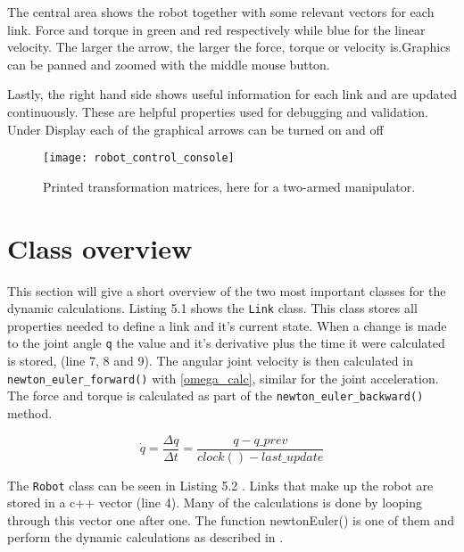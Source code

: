 The central area shows the robot together with some relevant vectors for each link. Force and torque in green and red respectively while blue for the linear velocity. The larger the arrow, the larger the force, torque or velocity is.Graphics can be panned and zoomed with the middle mouse button.

Lastly, the right hand side shows useful information for each link and are updated continuously. These are helpful properties used for debugging and validation. Under \textsf{Display} each of the graphical arrows can be turned on and off

\begin{figure}[h!]
    \centering
    \texttt{[image: robot\_control\_console]}
    \caption{Printed transformation matrices, here for a two-armed manipulator.}
    \label{console}
\end{figure}


\section{Class overview}

This section will give a short overview of the two most important classes for the dynamic calculations. Listing 5.1  shows the \texttt{Link} class. This class stores all properties needed to define a link and it's current state. When a change is made to the joint angle \texttt{q} the value and it's derivative plus the time it were calculated is stored, (line 7, 8 and 9). The angular joint velocity is then calculated in \texttt{newton\_euler\_forward()} with \eqref{omega_calc}, similar for the joint acceleration. The force and torque is calculated as part of the \texttt{newton\_euler\_backward()} method.


\label{Link}

\begin{equation}\label{omega_calc}
\dot{q} = \frac{\Delta q}{\Delta t}=\frac{q-q\_prev}{clock()-last\_update}
\end{equation}

\label{Robot}

The \texttt{Robot} class can be seen in Listing 5.2 . Links that make up the robot are stored in a c++ vector (line 4). Many of the calculations is done by looping through this vector one after one. The function \textsf{newtonEuler()} is one of them and perform the dynamic calculations as described in .


